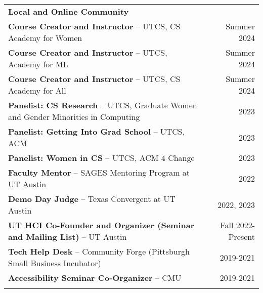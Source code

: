 \begin{longtable}{Xr}
	\textbf{Local and Online Community} &  \\
	\textbf{Course Creator and Instructor} -- UTCS, CS Academy for Women & Summer 2024 \\
	\textbf{Course Creator and Instructor} -- UTCS, Academy for ML & Summer 2024 \\
	\textbf{Course Creator and Instructor} -- UTCS, CS Academy for All & Summer 2024 \\
	\textbf{Panelist: CS Research} -- UTCS, Graduate Women and Gender Minorities in Computing & 2023 \\
	\textbf{Panelist: Getting Into Grad School} -- UTCS, ACM & 2023 \\
	\textbf{Panelist: Women in CS} -- UTCS, ACM 4 Change & 2023 \\
	\textbf{Faculty Mentor} -- SAGES Mentoring Program at UT Austin & 2022 \\
	\textbf{Demo Day Judge} -- Texas Convergent at UT Austin & 2022, 2023 \\
	\textbf{UT HCI Co-Founder and Organizer (Seminar and Mailing List)} -- UT Austin & Fall 2022-Present \\
	\textbf{Tech Help Desk} -- Community Forge (Pittsburgh Small Business Incubator) & 2019-2021 \\
	\textbf{Accessibility Seminar Co-Organizer} -- CMU & 2019-2021 \\
	\\

\end{longtable}